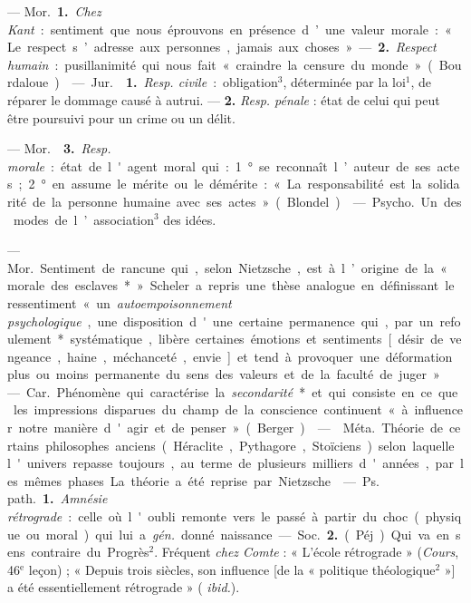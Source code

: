 \begin{itemize}[leftmargin=1cm, label=, itemsep=1pt]
 — \si{Mor.} {\bf 1.} {\it Chez Kant} : sentiment que nous
éprouvons en présence d’une valeur morale : « Le respect s’adresse aux
personnes, jamais aux choses » — {\bf 2.} {\it Respect humain} :
pusillanimité qui nous fait « craindre la censure du monde » (Bourdaloue).

 — \si{Jur.}  {\bf 1.} {\it Resp. civile} :
obligation$^3$, déterminée par la loi$^1$, de réparer le dommage causé à
autrui. — {\bf 2.} {\it Resp. pénale} : état de celui qui peut être poursuivi
pour un crime ou un délit.

— \si{Mor.}  {\bf 3.} {\it Resp. morale} : état de l'agent
moral qui : 1° se reconnaît l’auteur de ses actes; 2° en assume le mérite ou
le démérite : « La responsabilité est la solidarité de la personne humaine
avec ses actes » (Blondel).

 — \si{Psycho.} Un des modes de
l’association$^3$ des idées.

 — \si{Mor.} Sentiment de rancune qui, selon Nietzsche, est
à l’origine de la « morale des esclaves* » Scheler a repris une thèse
analogue en définissant le ressentiment « un {\it autoempoisonnement
psychologique},... une disposition d'une certaine permanence qui, par un
refoulement* systématique, libère certaines émotions et sentiments [désir de
vengeance, haine, méchanceté, envie] et tend à provoquer une déformation plus
ou moins permanente du sens des valeurs et de la faculté de juger ».

 — \si{Car.} Phénomène qui caractérise la
{\it secondarité}* et qui consiste en ce que les impressions disparues du
champ de la conscience continuent « à influencer notre manière d'agir et de
penser » (Berger).

 —  \si{Méta.} Théorie de certains
philosophes anciens (Héraclite, Pythagore, Stoïciens) selon laquelle
l'univers repasse toujours, au terme de plusieurs milliers d'années, par les
mêmes phases. La théorie a été reprise par Nietzsche.

 — \si{Ps. path.} {\bf 1.} {\it Amnésie rétrograde} : celle où
l'oubli remonte vers le passé à partir du choc (physique ou moral) qui lui a
{\it gén.} donné naissance. — \si{Soc.} {\bf 2.} (Péj.) Qui va en sens
contraire du Progrès$^2$. Fréquent {\it chez Comte} : « L'école rétrograde
» ({\it Cours}, 46$^\text{e}$ leçon) ; « Depuis trois siècles, son influence
[de la « politique théologique$^2$ »] a été essentiellement rétrograde » ({\it
ibid.}).


\end{itemize}
